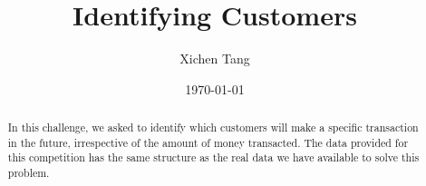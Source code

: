 \documentclass{amsart}
\begin{document}
%
%
\title[Kaggle subject]{Identifying Customers}%

\author{Xichen Tang}
\address[A.~1]{QUT,\\
QUT, Xichen Tang 710065, China}%

%
%
\date{\today}%

\begin{abstract}
\par
In this challenge, we asked to  identify which customers will make a specific transaction in the future, irrespective of the amount of money transacted. The data provided for this competition has the same structure as the real data we have available to solve this problem.
\end{abstract}

\maketitle
\tableofcontents

\newpage



\newpage



\listoftodos
\end{document}
